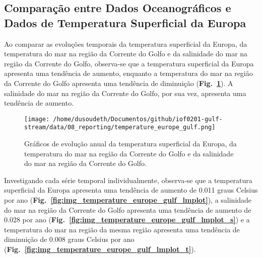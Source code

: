 \documentclass[journal]{IEEEtran}
\newcommand{\figref}[1]{(\textbf{Fig.~\ref{#1}})}
\begin{document}
        \subsection{Comparação entre Dados Oceanográficos e Dados de Temperatura Superficial da Europa}
            Ao comparar as evoluções temporais da temperatura superficial da Europa, da temperatura do mar na região da Corrente do Golfo e da salinidade do mar na região da Corrente do Golfo, observa-se que a temperatura superficial da Europa apresenta uma tendência de aumento, enquanto a temperatura do mar na região da Corrente do Golfo apresenta uma tendência de diminuição \figref{fig:img_temperature_europe_gulf}. A salinidade do mar na região da Corrente do Golfo, por sua vez, apresenta uma tendência de aumento. 
            \begin{figure}[ht]
                \centering
                \texttt{[image: /home/dusoudeth/Documentos/github/iof0201-gulf-stream/data/08\_reporting/temperature\_europe\_gulf.png]}
                \caption{Gráficos de evolução anual da temperatura superficial da Europa, da temperatura do mar na região da Corrente do Golfo e da salinidade do mar na região da Corrente do Golfo.}
                \label{fig:img_temperature_europe_gulf}
            \end{figure}
            Investigando cada série temporal individualmente, observa-se que a temperatura superficial da Europa apresenta uma tendência de aumento de 0.011 graus Celsius por ano \figref{fig:img_temperature_europe_gulf_lmplot}, a salinidade do mar na região da Corrente do Golfo apresenta uma tendência de aumento de 0.028 por ano \figref{fig:img_temperature_europe_gulf_lmplot_s} e a temperatura do mar na região da mesma região apresenta uma tendência de diminuição de 0.008 graus Celsius por ano \figref{fig:img_temperature_europe_gulf_lmplot_t}. 
\end{document}
